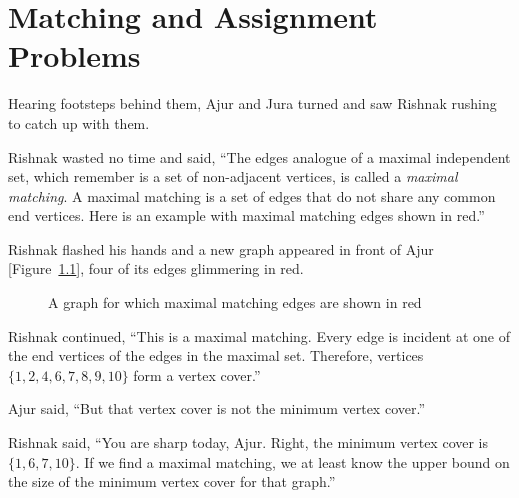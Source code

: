 \chapter{Matching and Assignment Problems}

Hearing footsteps behind them, Ajur and Jura turned and saw Rishnak rushing to catch up with them.

Rishnak wasted no time and said, ``The edges analogue of a maximal independent set, which remember is a set of non-adjacent vertices, is called a \textit{maximal matching}. A maximal matching is a set of edges that do not share any common end vertices. Here is an example with maximal matching edges shown in red.''

Rishnak flashed his hands and a new graph appeared in front of Ajur [Figure~\ref{16g1}], four of its edges glimmering in red.

\begin{figure}
\begin{center}

\caption{A graph for which maximal matching edges are shown in red}\label{16g1}
\end{center}
\end{figure}

Rishnak continued, ``This is a maximal matching. Every edge is incident at one of the end vertices of the edges in the maximal set. Therefore, vertices~$\{1,2,4,6,7,8,9,10\}$ form a vertex cover.''

Ajur said, ``But that vertex cover is not the minimum vertex cover.''

Rishnak said, ``You are sharp today, Ajur. Right, the minimum vertex cover is~$\{1,6,7,10\}$. If we find a maximal matching, we at least know the upper bound on the size of the minimum vertex cover for that graph.''

